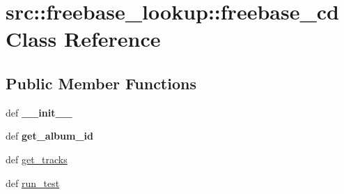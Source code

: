 \hypertarget{classsrc_1_1freebase__lookup_1_1freebase__cd}{
\section{src::freebase\_\-lookup::freebase\_\-cd Class Reference}
\label{classsrc_1_1freebase__lookup_1_1freebase__cd}
}
\subsection*{Public Member Functions}
\begin{DoxyCompactItemize}
\item 
\hypertarget{classsrc_1_1freebase__lookup_1_1freebase__cd_a02ec8c8864c34c18297e2df141735c4e}{
def {\bfseries \_\-\_\-init\_\-\_\-}}
\label{classsrc_1_1freebase__lookup_1_1freebase__cd_a02ec8c8864c34c18297e2df141735c4e}

\item 
\hypertarget{classsrc_1_1freebase__lookup_1_1freebase__cd_a2adb8b648b806d71eca3007bbbe9ccc5}{
def {\bfseries get\_\-album\_\-id}}
\label{classsrc_1_1freebase__lookup_1_1freebase__cd_a2adb8b648b806d71eca3007bbbe9ccc5}

\item 
def \hyperlink{classsrc_1_1freebase__lookup_1_1freebase__cd_adf1a868bf7e0cc592ece9b5fab021a7e}{get\_\-tracks}
\item 
def \hyperlink{classsrc_1_1freebase__lookup_1_1freebase__cd_ac302e6972fbd1456e6f0e7795b9c2f78}{run\_\-test}
\end{DoxyCompactItemize}


